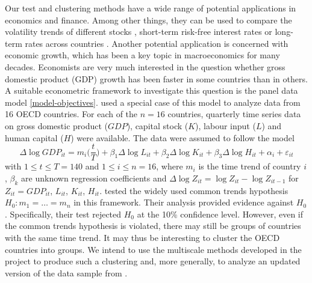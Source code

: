 \documentclass[a4paper,12pt]{article}
\begin{document}
Our test and clustering methods have a wide range of potential applications in economics and finance. Among other things, they can be used to compare the volatility trends of different stocks \citep{Nyblom2000}, short-term risk-free interest rates \citep{Fan2008,Park2009} or long-term rates across countries \citep{Park2009}.
Another potential application is concerned with economic growth, which has been a key topic in macroeconomics for many decades. Economists are very much interested in the question whether gross domestic product (GDP) growth has been faster in some countries than in others. A suitable econometric framework to investigate this question is the panel data model \eqref{model-objectives}. \cite{Zhang2012} used a special case of this model to analyze data from 16 OECD countries. For each of the $n=16$ countries, quarterly time series data on gross domestic product ($GDP$), capital stock ($K$), labour input ($L$) and human capital ($H$) were available. The data were assumed to follow the model 
\[ \Delta \log GDP_{it} = m_i\Big(\frac{t}{T}\Big) + \beta_1 \Delta \log L_{it} + \beta_2 \Delta \log K_{it} + \beta_3 \Delta \log H_{it} + \alpha_i + \varepsilon_{it} \]
with $1 \le t \le T = 140$ and $1 \le i \le n = 16$, where $m_i$ is the time trend of country $i$, $\beta_k$ are unknown regression coefficients and $\Delta \log Z_{it} = \log Z_{it} - \log Z_{it-1}$ for $Z_{it} = GDP_{it}$, $L_{it}$, $K_{it}$, $H_{it}$. \cite{Zhang2012} tested the widely used common trends hypothesis $H_0: m_1 = \ldots = m_n$ in this framework. Their analysis provided evidence against $H_0$. Specifically, their test rejected $H_0$ at the 10\% confidence level. However, even if the common trends hypothesis is violated, there may still be groups of countries with the same time trend. It may thus be interesting to cluster the OECD countries into groups. We intend to use the multiscale methods developed in the project to produce such a clustering and, more generally, to analyze an updated version of the data sample from \cite{Zhang2012}. 
\end{document}

